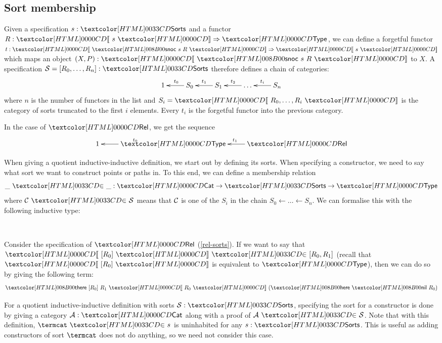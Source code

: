 \subsection{Sort membership}

Given a specification $s : \sortsty$ and a functor
$R : \Func{\SortCat{s}}{\Type}$, we can define a forgetful functor
$t : \Func{\SortCat{\sortssnoc\ s\ R}}{\SortCat{s}}$ which maps an object
$(X , P) : \SortCat{\sortssnoc\ s\ R}$ to $X$. A specification
$\Ss = [R_0, \ldots, R_n] : \sortsty$ therefore defines a chain of
categories:
$$
\xymatrix{
1 &S_0 \ar[l]_{t_0} &S_1 \ar[l]_{t_1} &\hdots \ar[l]_{t_2} &S_n \ar[l]_{t_i}
}
$$
where $n$ is the number of functors in the list and
$S_i = \SortCat{R_0, \ldots, R_i}$ is the category of sorts truncated
to the first $i$ elements. Every $t_i$ is the forgetful functor into
the previous category.

\begin{example}
In the case of $\Rel$, we get the sequence
\[
\xymatrix{
1 &\Type \ar[l]_{t_0} &\Rel \ar[l]_{t_1}
}
\]
\end{example}

When giving a quotient inductive-inductive definition, we start out by
defining its sorts. When specifying a constructor, we need to say what
sort we want to construct points or paths in. To this end, we can
define a membership relation
$$
  \sortsin{\_}{\_} : \Cat \to \sortsty \to \Type
$$
where $\sortsin{\Cc}{\Ss}$ means that $\mathcal{C}$ is one of the $S_i$ in the chain
${S_0 \leftarrow \ldots \leftarrow S_n}$. We can formalise this with
the following inductive type:
%
\begin{datatype}{\sortsin{\_}{\_}}{\Cat \to \sortsty \to \Type}
   \\
\end{datatype}
%
\begin{example}
  Consider the specification of $\Rel$ (\cref{rel-sorts}). If we want
  to say that $\sortsin{\SortCat{[R_0]}}{[R_0,R_1]}$ (recall that
  $\SortCat{[R_0]}$ is equivalent to $\Type$), then we can do so by
  giving the following term:
  $$
  \sortsinthere\ [R_0]\ R_1\ \SortCat{R_0}\ (\sortsinhere\ \sortsnil\ R_0)
  $$
\end{example}
%
For a quotient inductive-inductive definition with sorts
$\Ss : \sortsty$, specifying the sort for a constructor is done by
giving a category $\Aa : \Cat$ along with a proof of
$\sortsin{\Aa}{\Ss}$. Note that with this definition,
$\sortsin{\termcat}{s}$ is uninhabited for any $s : \sortsty$. This is
useful as adding constructors of sort $\termcat$ does not do anything,
so we need not consider this case.


